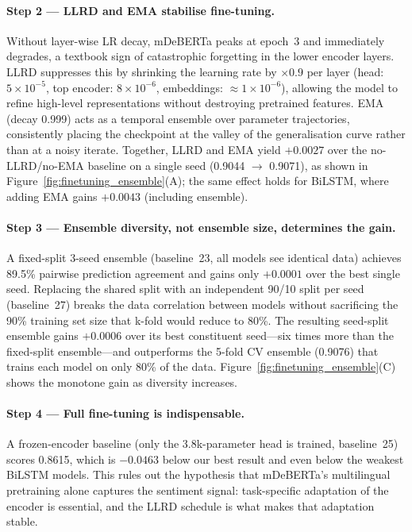 \documentclass{article}
\begin{document}
\paragraph{Step 2 — LLRD and EMA stabilise fine-tuning.}
Without layer-wise LR decay, mDeBERTa peaks at epoch~3 and immediately
degrades, a textbook sign of catastrophic forgetting in the lower
encoder layers.
LLRD suppresses this by shrinking the learning rate by $\times\!0.9$
per layer (head: $5{\times}10^{-5}$, top encoder: $8{\times}10^{-6}$,
embeddings: ${\approx}1{\times}10^{-6}$), allowing the model to
refine high-level representations without destroying pretrained features.
EMA (decay 0.999) acts as a temporal ensemble over parameter trajectories,
consistently placing the checkpoint at the valley of the generalisation
curve rather than at a noisy iterate.
Together, LLRD and EMA yield $+0.0027$ over the no-LLRD/no-EMA baseline
on a single seed (0.9044 $\to$ 0.9071), as shown in
Figure~\ref{fig:finetuning_ensemble}(A); the same effect holds for
BiLSTM, where adding EMA gains $+0.0043$ (including ensemble).

\paragraph{Step 3 — Ensemble diversity, not ensemble size, determines the gain.}
A fixed-split 3-seed ensemble (baseline~23, all models see identical data)
achieves 89.5\% pairwise prediction agreement and gains only $+0.0001$
over the best single seed.
Replacing the shared split with an independent 90/10 split per seed
(baseline~27) breaks the data correlation between models without
sacrificing the 90\% training set size that k-fold would reduce to 80\%.
The resulting seed-split ensemble gains $+0.0006$ over its best
constituent seed---six times more than the fixed-split ensemble---and
outperforms the 5-fold CV ensemble (0.9076) that trains each model on
only 80\% of the data.
Figure~\ref{fig:finetuning_ensemble}(C) shows the monotone gain as
diversity increases.

\paragraph{Step 4 — Full fine-tuning is indispensable.}
A frozen-encoder baseline (only the 3.8k-parameter head is trained,
baseline~25) scores 0.8615, which is $-0.0463$ below our best
result and even below the weakest BiLSTM models.
This rules out the hypothesis that mDeBERTa's multilingual pretraining
alone captures the sentiment signal: task-specific adaptation of the
encoder is essential, and the LLRD schedule is what makes that
adaptation stable.
\end{document}
